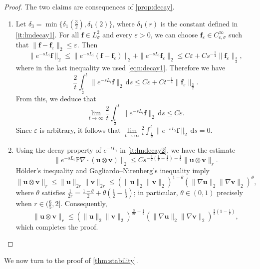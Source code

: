 \documentclass[10pt]{amsart}
\theoremstyle{plain}
\theoremstyle{definition}
\theoremstyle{remark}
\numberwithin{equation}{section}
\newcommand{\bu}{{\boldsymbol{u}}}
\newcommand{\bv}{{\boldsymbol{v}}}
\newcommand{\Bf}{{\boldsymbol{f}}}
\begin{document}
\begin{proof} The two claims are consequences of \cref{prop:decay}.
\begin{enumerate}[label={(\roman*)}]
    \item Let $\delta_3=\min\{\delta_1(\frac{3}{2}),\delta_1(2)\}$, where $\delta_1(r)$ is the constant defined in \cref{it:lmdecay1}. 
For all $\Bf \in L^2_\sigma$ and every $\varepsilon > 0$, we can choose $\Bf_\varepsilon \in C_{c,\sigma}^{\infty}$ such that $\|\Bf - \Bf_\varepsilon\|_2 \le \varepsilon$. Then 
\[
\|e^{-sL_i} \Bf\|_2 
\le \|e^{-sL_i} (\Bf - \Bf_\varepsilon)\|_2 + \|e^{-sL_i} \Bf_\varepsilon\|_2 
\le C \varepsilon + C s^{-\frac{1}{4}} \|\Bf_\varepsilon\|_{\frac32},
\]
where in the last inequality we used \cref{eqn:decay1}. Therefore we have
\[
\frac{2}{t} \int_{\frac{t}{2}}^{t} \|e^{-sL_i} \Bf\|_2 \, \mathrm d s 
\le C\varepsilon + Ct^{-\frac{1}{4}} \|\Bf_\varepsilon\|_{\frac{3}{2}}.
\]
From this, we deduce that
\[
\lim_{t \to \infty} \frac{2}{t} \int_{\frac{t}{2}}^{t} \|e^{-sL_i} \Bf\|_2 \, \mathrm ds \le C \varepsilon.
\]
Since $\varepsilon$ is arbitrary, it follows that $\lim\limits_{t \to \infty} \frac{2}{t} \int_{\frac{t}{2}}^{t} \|e^{-sL_i} \Bf\|_2 \, \mathrm ds = 0$.\\

\item  Using the decay property of $e^{-tL_i}$ in \cref{it:lmdecay2}, we have the estimate
\[
\|e^{-sL_i} \mathbb{P} \nabla\cdot (\bu \otimes \bv)\|_2 
\leq C s^{-\frac{3}{2}\left(\frac{1}{r}-\frac{1}{2}\right) - \frac{1}{2}} \|\bu \otimes \bv\|_r.
\]
H\"older's inequality and Gagliardo--Nirenberg's inequality imply 
\[
\|\bu \otimes \bv\|_r 
\le \|\bu\|_{2r} \| \bv\|_{2r}
\le (\|\bu\|_{2}\|\bv\|_{2})^{1-\theta} 
(\|\nabla \bu\|_{2}\|\nabla \bv\|_{2})^{\theta},
\]
where $\theta$ satisfies $\frac{1}{2r}=\frac{1-\theta}{2}+\theta(\frac{1}{2}-\frac{1}{3})$; in particular, $\theta\in(0,1)$ precisely when $r\in(\frac{6}{5},2]$. Consequently,
\[
\|\bu \otimes \bv\|_r 
\le  (\|\bu\|_{2}\|\bv\|_{2})^{\frac{3}{2r}-\frac{1}{2}} 
(\|\nabla \bu\|_{2}\|\nabla \bv\|_{2})^{\frac{3}{2}(1-\frac{1}{r})},
\]
which completes the proof.
\end{enumerate}
\end{proof}

We now turn to the proof of \cref{thm:stability}.  
\end{document}
